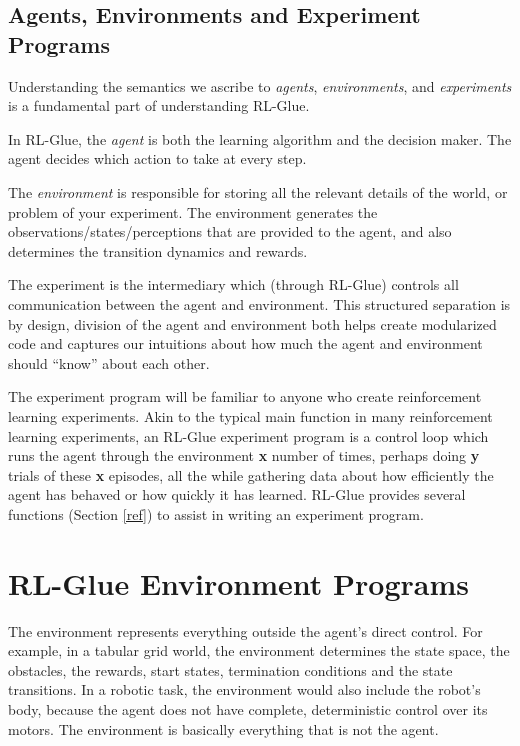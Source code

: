\documentclass[11pt]{article}
\begin{document}
\subsection{Agents, Environments and Experiment Programs}
Understanding the semantics we ascribe to \textit{agents}, \textit{environments}, and \textit{experiments} is a fundamental part of understanding RL-Glue.

In RL-Glue, the \textit{agent} is both the learning algorithm and the decision maker. The agent decides which action to take at every step.

The \textit{environment} is responsible for storing all the relevant details of the world, or problem of your experiment. The environment generates the observations/states/perceptions that are provided to the agent, and also determines the transition dynamics and rewards.  

The experiment is the intermediary which (through RL-Glue) controls all communication between the agent and environment.  This structured separation is by design, division of the agent and environment both helps create modularized code and captures our intuitions about how much the agent and environment should ``know'' about each other.

The experiment program will be familiar to anyone who create reinforcement learning experiments. Akin to the typical main function in many reinforcement learning experiments, an RL-Glue experiment program is a control loop which runs the agent through the environment {\bf x} number of times, perhaps doing {\bf y} trials of these {\bf x} episodes, all the while gathering data about how efficiently the agent has behaved or how quickly it has learned. RL-Glue provides several functions (Section \ref{ref}) to assist in writing an experiment program.



\section{RL-Glue Environment Programs}
\label{env}
The environment represents everything outside the agent's direct control. For example, in a tabular grid world, the environment determines the state space, the obstacles, the rewards, start states, termination conditions and the state transitions.  In a robotic task, the environment would also include the robot's body, because the agent does not have complete, deterministic control over its motors. The environment is basically everything that is not the agent.
\end{document}
